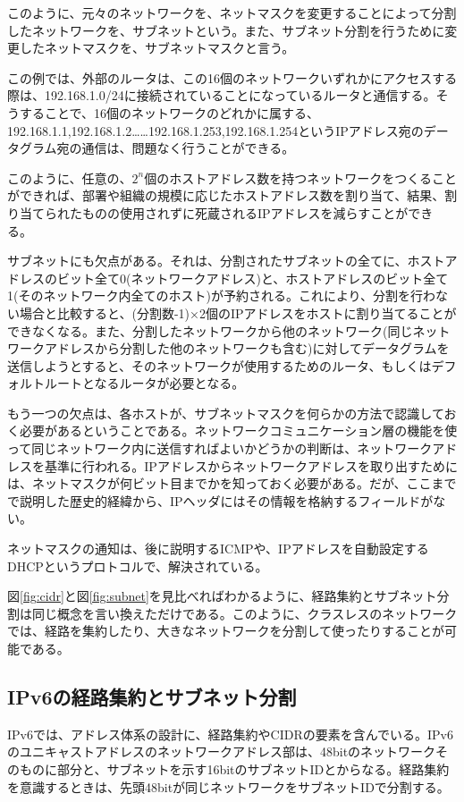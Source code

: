 このように、元々のネットワークを、ネットマスクを変更することによって分割したネットワークを、サブネットという。また、サブネット分割を行うために変更したネットマスクを、サブネットマスクと言う。

この例では、外部のルータは、この16個のネットワークいずれかにアクセスする際は、192.168.1.0/24に接続されていることになっているルータと通信する。そうすることで、16個のネットワークのどれかに属する、 192.168.1.1,192.168.1.2……192.168.1.253,192.168.1.254というIPアドレス宛のデータグラム宛の通信は、問題なく行うことができる。

このように、任意の、$2^n$個のホストアドレス数を持つネットワークをつくることができれば、部署や組織の規模に応じたホストアドレス数を割り当て、結果、割り当てられたものの使用されずに死蔵されるIPアドレスを減らすことができる。

サブネットにも欠点がある。それは、分割されたサブネットの全てに、ホストアドレスのビット全て0(ネットワークアドレス)と、ホストアドレスのビット全て1(そのネットワーク内全てのホスト)が予約される。これにより、分割を行わない場合と比較すると、(分割数-1)×2個のIPアドレスをホストに割り当てることができなくなる。また、分割したネットワークから他のネットワーク(同じネットワークアドレスから分割した他のネットワークも含む)に対してデータグラムを送信しようとすると、そのネットワークが使用するためのルータ、もしくはデフォルトルートとなるルータが必要となる。

もう一つの欠点は、各ホストが、サブネットマスクを何らかの方法で認識しておく必要があるということである。ネットワークコミュニケーション層の機能を使って同じネットワーク内に送信すればよいかどうかの判断は、ネットワークアドレスを基準に行われる。IPアドレスからネットワークアドレスを取り出すためには、ネットマスクが何ビット目までかを知っておく必要がある。だが、ここまでで説明した歴史的経緯から、IPヘッダにはその情報を格納するフィールドがない。

ネットマスクの通知は、後に説明するICMPや、IPアドレスを自動設定するDHCPというプロトコルで、解決されている。

図\ref{fig:cidr}と図\ref{fig:subnet}を見比べればわかるように、経路集約とサブネット分割は同じ概念を言い換えただけである。このように、クラスレスのネットワークでは、経路を集約したり、大きなネットワークを分割して使ったりすることが可能である。

\subsection{IPv6の経路集約とサブネット分割}
IPv6では、アドレス体系の設計に、経路集約やCIDRの要素を含んでいる。IPv6のユニキャストアドレスのネットワークアドレス部は、48bitのネットワークそのものに部分と、サブネットを示す16bitのサブネットIDとからなる。経路集約を意識するときは、先頭48bitが同じネットワークをサブネットIDで分割する。

